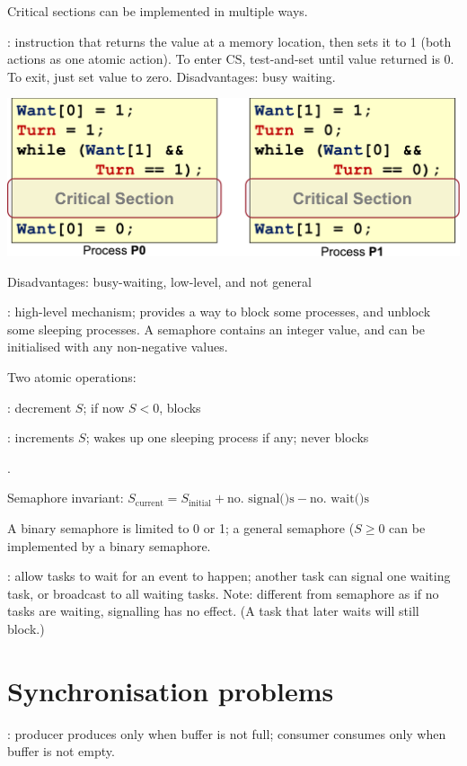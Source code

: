 \documentclass[fontsize=9pt]{slnotes}
\begin{document}
Critical sections can be implemented in multiple ways.

: instruction that returns the value at a memory location, then sets it to 1 (both actions as one atomic action). To enter CS, test-and-set until value returned is 0. To exit, just set value to zero. Disadvantages: busy waiting.


\includegraphics[width=\columnwidth]{petersons.pdf}

Disadvantages: busy-waiting, low-level, and not general

: high-level mechanism; provides a way to block some processes, and unblock some sleeping processes. A semaphore contains an integer value, and can be initialised with any non-negative values.

Two atomic operations: \begin{slinenum}
\item {}: decrement \(S\); if now \(S < 0\), blocks
\item {}: increments \(S\); wakes up one sleeping process if any; never blocks
\end{slinenum}.

Semaphore invariant: \(S_{\text{current}} = S_{\text{initial}} + \text{no. signal()s} - \text{no. wait()s}\)

A binary semaphore is limited to 0 or 1; a general semaphore (\(S \ge 0\) can be implemented by a binary semaphore.

: allow tasks to wait for an event to happen; another task can signal one waiting task, or broadcast to all waiting tasks. Note: different from semaphore as if no tasks are waiting, signalling has no effect. (A task that later waits will still block.)

\section{Synchronisation problems}
: producer produces only when buffer is not full; consumer consumes only when buffer is not empty.
\end{document}
